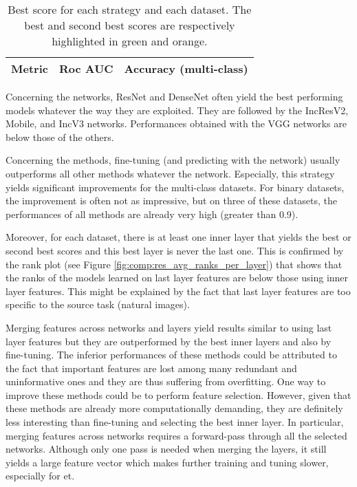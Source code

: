 \begin{table}
\begin{tabular}{|l||c|c|c|c|c||c|c|c|}
      \hline
      \textbf{Metric} & \multicolumn{5}{c||}{Roc AUC} & \multicolumn{3}{c|}{Accuracy (multi-class)} \\
      \hline
    \end{tabular}
      \caption{Best score for each strategy and each dataset. The best and second best scores are respectively highlighted in green and orange.}
    \label{tab:comp:res_best_scores_per_strategy}
\end{table}

Concerning the networks, ResNet and DenseNet often yield the best performing models whatever the way they are exploited. They are followed by the IncResV2, Mobile, and IncV3 networks. Performances obtained with the VGG networks are below those of the others.

Concerning the methods, fine-tuning (and predicting with the network) usually outperforms all other methods whatever the network. Especially, this strategy yields significant improvements for the multi-class datasets. For binary datasets, the improvement is often not as impressive, but on three of these datasets, the performances of all methods are already very high (greater than 0.9).

Moreover, for each dataset, there is at least one inner layer that yields the best or second best scores and this best layer is never the last one. This is confirmed by the rank plot (see Figure \ref{fig:comp:res_avg_ranks_per_layer}) that shows that the ranks of the models learned on last layer features are below those using inner layer features. This might be explained by the fact that last layer features are too specific to the source task (\ie natural images).

Merging features across networks and layers yield results similar to using last layer features but they are outperformed by the best inner layers and also by fine-tuning. The inferior performances of these methods could be attributed to the fact that important features are lost among many redundant and uninformative ones and they are thus suffering from overfitting. One way to improve these methods could be to perform feature selection. However, given that these methods are already more computationally demanding, they are definitely less interesting than fine-tuning and selecting the best inner layer. In particular, merging features across networks requires a forward-pass through all the selected networks. Although only one pass is needed when merging the layers, it still yields a large feature vector which makes further training and tuning slower, especially for \acrshort{et}.

